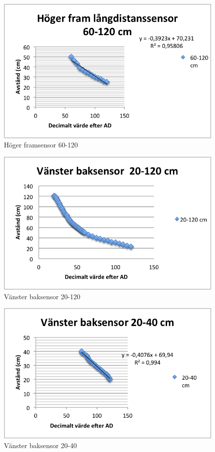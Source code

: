 \begin{figure}[H]
  \centering
 \includegraphics[angle=0,scale=1]{bilder/HF_60_120.png}
  \caption{Höger framsensor 60-120}
\end{figure}

\begin{figure}[H]
  \centering
 \includegraphics[angle=0,scale=1]{bilder/VB_20_120.png}
  \caption{Vänster baksensor 20-120}
\end{figure}

\begin{figure}[H]
  \centering
 \includegraphics[angle=0,scale=1]{bilder/VB_20_40.png}
  \caption{Vänster baksensor 20-40}
\end{figure}



